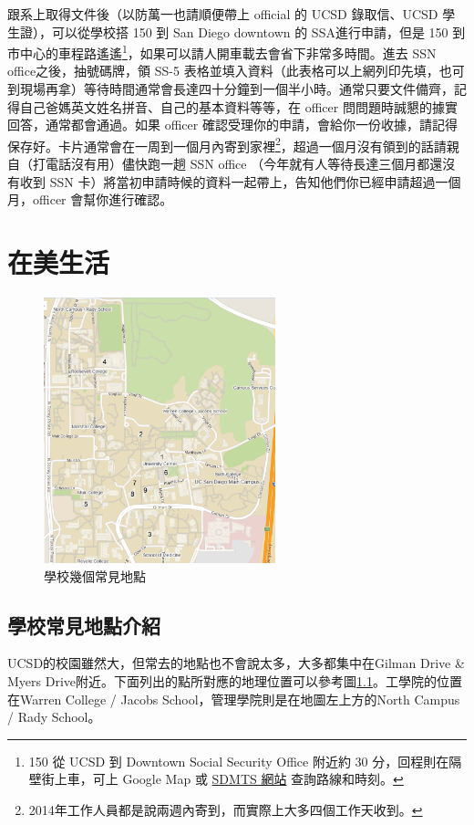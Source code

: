 \documentclass[10pt,a4paper]{book}
\begin{document}
\begin{CJK}{UTF8}{bkai}
跟系上取得文件後（以防萬一也請順便帶上 official 的 UCSD 錄取信、UCSD 學生證），可以從學校搭 150 到 San Diego downtown 的 SSA進行申請，但是 150 到市中心的車程路遙遙\footnote{150 從 UCSD 到 Downtown Social Security Office 附近約 30 分，回程則在隔壁街上車，可上 Google Map 或 \href{http://www.sdmts.com/}{SDMTS 網站} 查詢路線和時刻。}，如果可以請人開車載去會省下非常多時間。進去 SSN office之後，抽號碼牌，領 SS-5 表格並填入資料（此表格可以上網列印先填，也可到現場再拿）等待時間通常會長達四十分鐘到一個半小時。通常只要文件備齊，記得自己爸媽英文姓名拼音、自己的基本資料等等，在 officer 問問題時誠懇的據實回答，通常都會通過。如果 officer 確認受理你的申請，會給你一份收據，請記得保存好。卡片通常會在一周到一個月內寄到家裡\footnote{2014年工作人員都是說兩週內寄到，而實際上大多四個工作天收到。}，超過一個月沒有領到的話請親自（打電話沒有用）儘快跑一趟 SSN office （今年就有人等待長達三個月都還沒有收到 SSN 卡）將當初申請時候的資料一起帶上，告知他們你已經申請超過一個月，officer 會幫你進行確認。

\chapter{在美生活}

\begin{figure}
\centering
\includegraphics[width=0.6\textwidth]{Pics/map}
\caption{學校幾個常見地點} \label{fig:map}
\end{figure}

\section{學校常見地點介紹}
UCSD的校園雖然大，但常去的地點也不會說太多，大多都集中在Gilman Drive \& Myers Drive附近。下面列出的點所對應的地理位置可以參考圖\ref{fig:map}。工學院的位置在Warren College / Jacobs School，管理學院則是在地圖左上方的North Campus / Rady School。


\end{CJK}
\end{document}
